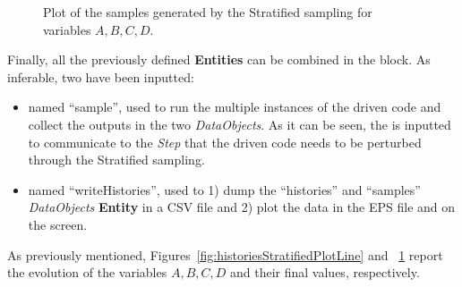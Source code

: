 \begin{enumerate}
\begin{figure}[h!]
  \caption{Plot of the samples generated by the Stratified sampling for variables $A,B,C,D$.}
  \label{fig:samplesStratifiedPlotLine}
 \end{figure}
   Finally, all the previously defined \textbf{Entities} can be combined in
   the  block. As inferable,
   two  have been inputted:
   \begin{itemize}
     \item {} named ``sample'', used to run the multiple
     instances of the driven code and
     collect the outputs in the two \textit{DataObjects}. As it can be
     seen, the  is inputted to communicate to the
     \textit{Step} that the driven code needs to
     be perturbed through the Stratified sampling.
     \item  {} named ``writeHistories'', used to 1) dump
     the ``histories'' and ``samples'' \textit{DataObjects}
     \textbf{Entity} in a CSV file and 2) plot the data in the EPS file and
     on the screen.
   \end{itemize}
\end{enumerate}
 As previously mentioned, Figures~\ref{fig:historiesStratifiedPlotLine} and ~\ref{fig:samplesStratifiedPlotLine}  report the evolution of the
 variables $A,B,C,D$ and their final values, respectively.


